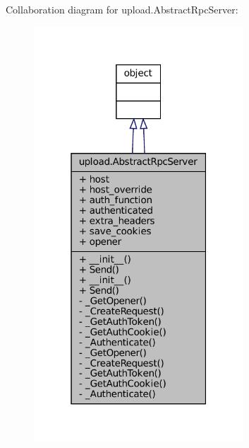 Collaboration diagram for upload.\+Abstract\+Rpc\+Server\+:
\nopagebreak
\begin{figure}[H]
\begin{center}
\leavevmode
\includegraphics[width=223pt]{classupload_1_1AbstractRpcServer__coll__graph}
\end{center}
\end{figure}
